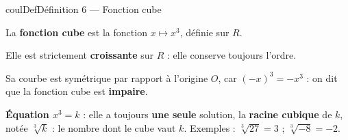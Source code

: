 \documentclass[11pt,a4paper]{article}
\makeatletter
\newcommand{\R}{\mathbb{R}}
\newcommand{\N}{\mathbb{N}}
\newcommand{\Z}{\mathbb{Z}}
\newcommand{\Q}{\mathbb{Q}}
\newcommand{\vect}[1]{\overrightarrow{#1}}
\newcommand{\fois}[1]{\times{\color{coulExo}#1}}
\newcommand{\lycee@repere}[4]{%
  \draw[grille,step=1] (#1,#2) grid (#3,#4);
  \draw[-{Stealth[length=2mm]},thick] (#1,0)--({#3+0.4},0) node[below left=-1pt]{$x$};
  \draw[-{Stealth[length=2mm]},thick] (0,#2)--(0,{#4+0.4}) node[below left=-1pt]{$y$};
  \node[below left,font=\scriptsize,inner sep=1.5pt] at (0,0) {$0$};}
\newcommand{\lycee@gradx}[1]{\foreach \k/\l in {#1}{%
  \draw (\k,0.07)--(\k,-0.07) node[below,font=\scriptsize,inner sep=1.5pt]{$\l$};}}
\newcommand{\lycee@grady}[1]{\foreach \k/\l in {#1}{%
  \draw (0.07,\k)--(-0.07,\k) node[left,font=\scriptsize,inner sep=1.5pt]{$\l$};}}
\providecommand{\repere}{\lycee@repere}%
\providecommand{\gradx}{\lycee@gradx}%
\providecommand{\grady}{\lycee@grady}%
\providecommand{\Cf}{\mathcal{C}\sb{f}}%
\providecommand{\Cg}{\mathcal{C}\sb{g}}%
\newcounter{lycee@signet}
\newcommand{\signet}[3][]{\stepcounter{lycee@signet}%
  \edef\lycee@dest{\if\relax\detokenize{#1}\relax
    signet.\arabic{lycee@signet}\else#1\fi}%
  \hypertarget{\lycee@dest}{}\bookmark[level=#2,dest=\lycee@dest]{#3}}
\def\R{R}\def\N{N}\def\Z{Z}\def\Q{Q}\def\vect#1{#1}\def\Cf{Cf}\def\Cg{Cg}\def\fois#1{×#1}%
\newenvironment{definitionbox}[1][Définition]%
  {\begin{boitecours}[phantom={\signet{2}{#1}}]{coulDef}{#1}}{\end{boitecours}}
\makeatother
\begin{document}
\begin{definitionbox}[Définition 6 --- Fonction cube]
\begin{minipage}[t]{0.58\linewidth}\raggedright
\vspace{0pt}
La \textbf{fonction cube} est la fonction $x\longmapsto x^{3}$, définie sur $\R$.

\smallskip
Elle est strictement \textbf{croissante} sur $\R$ : elle conserve toujours l'ordre.
\begin{center}
\end{center}
Sa courbe est symétrique par rapport à l'origine $O$, car $(-x)^{3}=-x^{3}$ : on dit
que la fonction cube est \textbf{impaire}.

\smallskip
\textbf{Équation $x^{3}=k$} : elle a toujours \textbf{une seule} solution, la
\textbf{racine cubique} de $k$, notée $\sqrt[3]{k}$ : le nombre dont le cube vaut $k$.
Exemples : $\sqrt[3]{27}=3$ ; $\sqrt[3]{-8}=-2$.
\end{minipage}\hfill
\begin{minipage}[t]{0.38\linewidth}\centering
\vspace{0pt}
\end{minipage}
\end{definitionbox}
\end{document}
